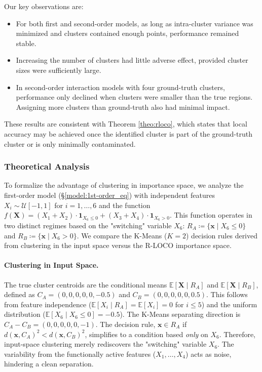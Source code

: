 \documentclass{article}
\theoremstyle{plain}
\theoremstyle{definition}
\theoremstyle{remark}
\begin{document}
Our key observations are:
\begin{itemize}
    \item For both first and second-order models, as long as intra-cluster variance was minimized and clusters contained enough points, performance remained stable.
    \item Increasing the number of clusters had little adverse effect, provided cluster sizes were sufficiently large.
    \item In second-order interaction models with four ground-truth clusters, performance only declined when clusters were smaller than the true regions. Assigning more clusters than ground-truth also had minimal impact.
\end{itemize}
These results are consistent with Theorem \ref{theo:rloco}, which states that local accuracy may be achieved once the identified cluster is part of the ground-truth cluster or is only minimally contaminated.

\subsubsection{Theoretical Analysis} \label{sec:why_feature_importance_cluster}

To formalize the advantage of clustering in importance space, we analyze the first-order model (\S\ref{model:1st-order_eq}) with independent features $X_i \sim \mathcal{U}[-1, 1]$ for $i=1, \dots, 6$ and the function $f(\mathbf{X}) = (X_1 + X_2) \cdot \mathbf{1}_{X_6 \leq 0} + (X_3 + X_4) \cdot \mathbf{1}_{X_6 > 0}.$ This function operates in two distinct regimes based on the "switching" variable $X_6$: $R_A \coloneqq \{ \mathbf{x} \mid X_6 \le 0 \}$ and $R_B \coloneqq \{ \mathbf{x} \mid X_6 > 0 \}$. We compare the K-Means ($K=2$) decision rules derived from clustering in the input space versus the R-LOCO importance space.

\paragraph{Clustering in Input Space.}
The true cluster centroids are the conditional means $\mathbb{E}[\mathbf{X} \mid R_A]$ and $\mathbb{E}[\mathbf{X} \mid R_B]$, defined as $C_A = (0, 0, 0, 0, 0, -0.5)$ and $C_B = (0, 0, 0, 0, 0, 0.5).$ This follows from feature independence ($\mathbb{E}[X_i \mid R_A] = \mathbb{E}[X_i] = 0$ for $i \le 5$) and the uniform distribution ($\mathbb{E}[X_6 \mid X_6 \le 0] = -0.5$). The K-Means separating direction is $C_A - C_B = (0, 0, 0, 0, 0, -1)$. The decision rule, $\mathbf{x} \in R_A$ if $d(\mathbf{x}, C_A)^2 < d(\mathbf{x}, C_B)^2$, simplifies to a condition based \emph{only} on $X_6$. Therefore, input-space clustering merely rediscovers the "switching" variable $X_6$. The variability from the functionally active features ($X_1, \dots, X_4$) acts as noise, hindering a clean separation.
\end{document}
